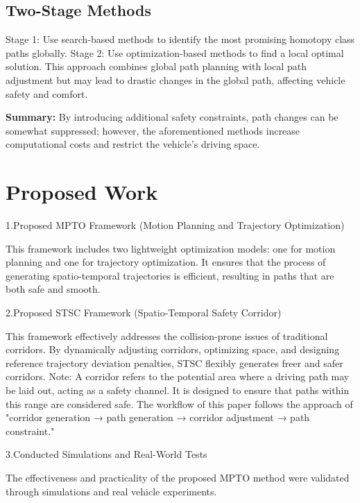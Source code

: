 \subsection{Two-Stage Methods}
Stage 1: Use search-based methods to identify the most promising homotopy class paths globally. Stage 2: Use optimization-based methods to find a local optimal solution. This approach combines global path planning with local path adjustment but may lead to drastic changes in the global path, affecting vehicle safety and comfort. 

\textbf{Summary:} By introducing additional safety constraints, path changes can be somewhat suppressed; however, the aforementioned methods increase computational costs and restrict the vehicle's driving space.

\section{Proposed Work}

1.Proposed MPTO Framework (Motion Planning and Trajectory Optimization)

This framework includes two lightweight optimization models: one for motion planning and one for trajectory optimization. It ensures that the process of generating spatio-temporal trajectories is efficient, resulting in paths that are both safe and smooth.

2.Proposed STSC Framework (Spatio-Temporal Safety Corridor)

This framework effectively addresses the collision-prone issues of traditional corridors. By dynamically adjusting corridors, optimizing space, and designing reference trajectory deviation penalties, STSC flexibly generates freer and safer corridors. Note: A corridor refers to the potential area where a driving path may be laid out, acting as a safety channel. It is designed to ensure that paths within this range are considered safe. The workflow of this paper follows the approach of "corridor generation → path generation → corridor adjustment → path constraint."

3.Conducted Simulations and Real-World Tests

The effectiveness and practicality of the proposed MPTO method were validated through simulations and real vehicle experiments.
